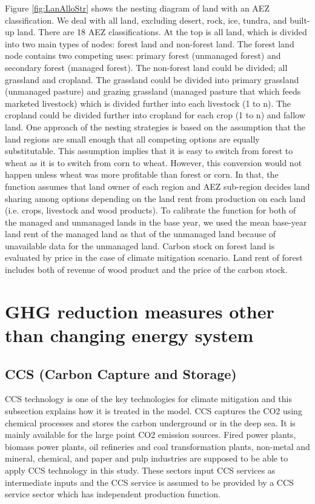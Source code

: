 \documentclass[10pt,a4paper,titlepage,dvipdfmx]{book}
\begin{document}
\begin{itemize}
Figure \ref{fig:LanAlloStr} shows the nesting diagram of land with an AEZ classification. We deal with all land, excluding desert, rock, ice, tundra, and built-up land. There are 18 AEZ classifications. At the top is all land, which is divided into two main types of nodes: forest land and non-forest land. The forest land node contains two competing uses: primary forest (unmanaged forest) and secondary forest (managed forest). The non-forest land could be divided; all grassland and cropland. The grassland could be divided into primary grassland (unmanaged pasture) and grazing grassland (managed pasture that which feeds marketed livestock) which is divided further into each livestock (1 to n). The cropland could be divided further into cropland for each crop (1 to n) and fallow land. One approach of the nesting strategies is based on the assumption that the land regions are small enough that all competing options are equally substitutable. This assumption implies that it is easy to switch from forest to wheat as it is to switch from corn to wheat. However, this conversion would not happen unless wheat was more profitable than forest or corn. In that, the function assumes that land owner of each region and AEZ sub-region decides land sharing among options depending on the land rent from production on each land (i.e. crops, livestock and wood products). To calibrate the function for both of the managed and unmanaged lands in the base year, we used the mean base-year land rent of the managed land as that of the unmanaged land because of unavailable data for the unmanaged land. Carbon stock on forest land is evaluated by price in the case of climate mitigation scenario. Land rent of forest includes both of revenue of wood product and the price of the carbon stock.

\section{\label{sec:GHGRedMeaOthThanCHaEneSys}{GHG reduction measures other than changing energy system}}

\subsection{\label{subsec:CCS}{CCS (Carbon Capture and Storage)}}

CCS technology is one of the key technologies for climate mitigation and this subsection explains how it is treated in the model. CCS captures the CO2 using chemical processes and stores the carbon underground or in the deep sea. It is mainly available for the large point CO2 emission sources. Fired power plants, biomass power plants, oil refineries and coal transformation plants, non-metal and mineral, chemical, and paper and pulp industries are supposed to be able to apply CCS technology in this study. These sectors input CCS services as intermediate inputs and the CCS service is assumed to be provided by a CCS service sector which has independent production function.


\end{itemize}
\end{document}
